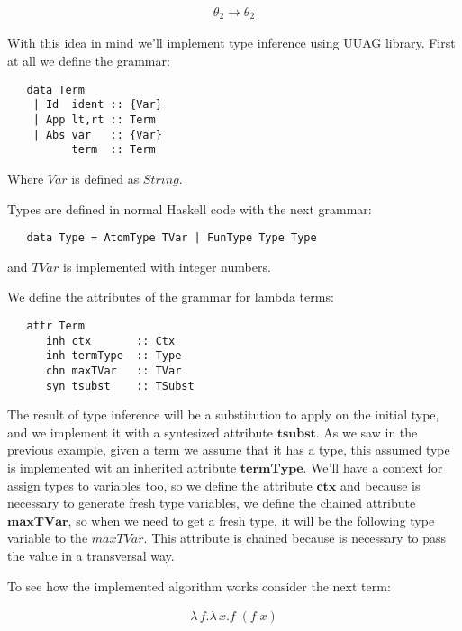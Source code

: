 \documentclass[a4paper,10pt]{article}
\begin{document}
  \begin{align*}
    {\theta_2 \rightarrow \theta_2}
  \end{align*} 
 
 \medskip
 
  With this idea in mind we'll implement type inference using UUAG library. First at all we define the grammar:
  
  \begin{lstlisting}
   data Term
	| Id  ident :: {Var}
	| App lt,rt :: Term
	| Abs var   :: {Var}
	      term  :: Term
  \end{lstlisting}

  Where $Var$ is defined as $String$.
  
  Types are defined in normal Haskell code with the next grammar:
  
  \begin{lstlisting}
   data Type = AtomType TVar | FunType Type Type
  \end{lstlisting}

  \indent and $TVar$ is implemented with integer numbers.
  \medskip
  
  We define the attributes of the grammar for lambda terms:
  
  \begin{lstlisting}
   attr Term 
      inh ctx       :: Ctx
      inh termType  :: Type
      chn maxTVar   :: TVar
      syn tsubst    :: TSubst
  \end{lstlisting}

  The result of type inference will be a substitution to apply on the initial type, and we implement it with a
  syntesized attribute $\mathbf{tsubst}$. As we saw in the previous example, given a term we assume that it has
  a type, this assumed type is implemented wit an inherited attribute $\mathbf{termType}$. We'll have a context
  for assign types to variables too, so we define the attribute $\mathbf{ctx}$ and because is necessary 
  to generate fresh type variables, we define the chained attribute $\mathbf{maxTVar}$, so when we need
  to get a fresh type, it will be the following type variable to the $maxTVar$. This attribute is chained
  because is necessary to pass the value in a transversal way.
  
  To see how the implemented algorithm works consider the next term:
  
 \begin{align*}
    \lambda\,f.\lambda\,x.f\;(f\;x)
 \end{align*}
\end{document}
